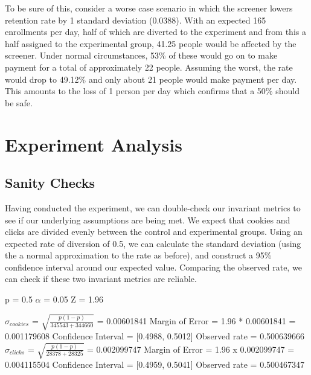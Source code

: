 \documentclass[paper=a4, fontsize=11pt]{scrartcl} %
\numberwithin{equation}{section} %
\numberwithin{figure}{section} %
\numberwithin{table}{section} %
\begin{document}
To be sure of this, consider a worse case scenario in which the screener lowers retention rate by 1 standard deviation (0.0388).  With an expected 165 enrollments per day, half of which are diverted to the experiment and from this a half assigned to the experimental group, 41.25 people would be affected by the screener.  Under normal circumstances, 53\% of these would go on to make payment for a total of approximately 22 people.  Assuming the worst, the rate would drop to 49.12\% and only about 21 people would make payment per day.  This amounts to the loss of 1 person per day which confirms that a 50\% should be safe. \newline



\section{Experiment Analysis}

\subsection{Sanity Checks}

Having conducted the experiment, we can double-check our invariant metrics to see if our underlying assumptions are being met.  We expect that cookies and clicks are divided evenly between the control and experimental groups.  Using an expected rate of diversion of 0.5, we can calculate the standard deviation (using the a normal approximation to the rate as before), and construct a 95\% confidence interval around our expected value.  Comparing the observed rate, we can check if these two invariant metrics are reliable.\newline

p = 0.5\quad
$\alpha$ = 0.05\quad
Z = 1.96
\newline

$\sigma_{cookies}$ = $\sqrt{\frac{p(1-p)}{345543 + 344660}}$ = 0.00601841
\newline
Margin of Error = 1.96 * 0.00601841 = 0.001179608
\newline
Confidence Interval = [0.4988, 0.5012]
\newline
Observed rate = 0.500639666
\newline
\newline
$\sigma_{clicks}$ = $\sqrt{\frac{p(1-p)}{28378 + 28325}}$ = 0.002099747
\newline
Margin of Error = 1.96 x 0.002099747 = 0.004115504
\newline
Confidence Interval = [0.4959, 0.5041]
\newline
Observed rate = 0.500467347
\newline
\end{document}
